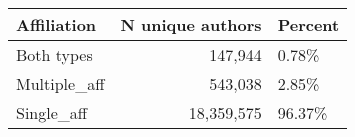 \begin{tabular}{lrl}
\hline
 Affiliation   &   N unique authors & Percent   \\
\hline
 Both types    &            147,944 & 0.78\%     \\
 Multiple\_aff  &            543,038 & 2.85\%     \\
 Single\_aff    &         18,359,575 & 96.37\%    \\
\hline
\end{tabular}